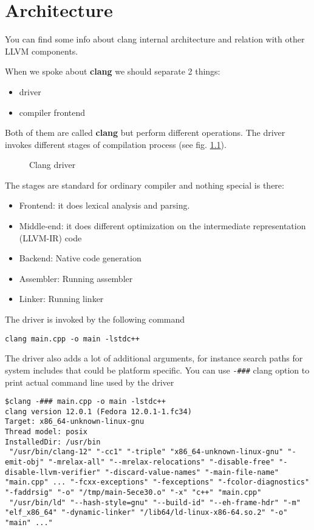 \chapter{Architecture}

You can find some info about clang internal architecture and relation
with other LLVM components.

When we spoke about \textbf{clang} we should separate 2 things:
\begin{itemize}
\item driver
\item compiler frontend 
\end{itemize}
Both of them are called \textbf{clang} but perform different
operations. The driver invokes different stages of compilation process
(see fig. \ref{fig:clang_driver}). 
\begin{figure}
\begin{center}
\end{center}
  \caption{Clang driver}
  \label{fig:clang_driver}
\end{figure}
The stages are standard for ordinary compiler and nothing special is
there:
\begin{itemize}
\item Frontend: it does lexical analysis and parsing.
\item Middle-end: it does different optimization on the intermediate
  representation (LLVM-IR) code
\item Backend: Native code generation
\item Assembler: Running assembler
\item Linker: Running linker
\end{itemize}

The driver is invoked by the following command
\begin{verbatim}
clang main.cpp -o main -lstdc++
\end{verbatim}
The driver also adds a lot of additional arguments, for instance
search paths for system includes that could be platform specific.
You can use \texttt{-###} clang option to print actual
command line used by the driver
\begin{verbatim}
$clang -### main.cpp -o main -lstdc++
clang version 12.0.1 (Fedora 12.0.1-1.fc34)
Target: x86_64-unknown-linux-gnu
Thread model: posix
InstalledDir: /usr/bin
 "/usr/bin/clang-12" "-cc1" "-triple" "x86_64-unknown-linux-gnu" "-emit-obj" "-mrelax-all" "--mrelax-relocations" "-disable-free" "-disable-llvm-verifier" "-discard-value-names" "-main-file-name" "main.cpp" ... "-fcxx-exceptions" "-fexceptions" "-fcolor-diagnostics" "-faddrsig" "-o" "/tmp/main-5ece30.o" "-x" "c++" "main.cpp"
 "/usr/bin/ld" "--hash-style=gnu" "--build-id" "--eh-frame-hdr" "-m" "elf_x86_64" "-dynamic-linker" "/lib64/ld-linux-x86-64.so.2" "-o" "main" ..."
\end{verbatim}

